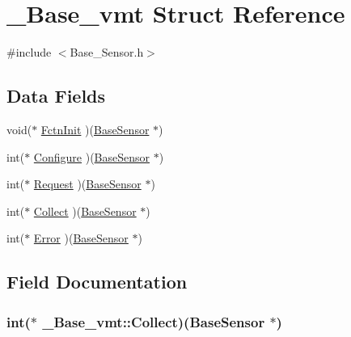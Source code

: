 \hypertarget{struct___base__vmt}{\section{\-\_\-\-Base\-\_\-vmt Struct Reference}
\label{struct___base__vmt}
}


{\ttfamily \#include $<$Base\-\_\-\-Sensor.\-h$>$}

\subsection*{Data Fields}
\begin{DoxyCompactItemize}
\item 
void($\ast$ \hyperlink{struct___base__vmt_ab21211ac2888f2e9c15ea3f7bdfe3e82}{Fctn\-Init} )(\hyperlink{_base___sensor_8h_ae91aa07b7bce6c6b463d63d8f214bb37}{Base\-Sensor} $\ast$)
\item 
int($\ast$ \hyperlink{struct___base__vmt_a4679051b7c8d66b3f4546c5e7c3d1457}{Configure} )(\hyperlink{_base___sensor_8h_ae91aa07b7bce6c6b463d63d8f214bb37}{Base\-Sensor} $\ast$)
\item 
int($\ast$ \hyperlink{struct___base__vmt_a082d37f332222c418394227f2de537f7}{Request} )(\hyperlink{_base___sensor_8h_ae91aa07b7bce6c6b463d63d8f214bb37}{Base\-Sensor} $\ast$)
\item 
int($\ast$ \hyperlink{struct___base__vmt_a3cb37486697b061a59526b2efa852ba4}{Collect} )(\hyperlink{_base___sensor_8h_ae91aa07b7bce6c6b463d63d8f214bb37}{Base\-Sensor} $\ast$)
\item 
int($\ast$ \hyperlink{struct___base__vmt_a64d04ad91e33e5f4636187057220cadd}{Error} )(\hyperlink{_base___sensor_8h_ae91aa07b7bce6c6b463d63d8f214bb37}{Base\-Sensor} $\ast$)
\end{DoxyCompactItemize}


\subsection{Field Documentation}
\hypertarget{struct___base__vmt_a3cb37486697b061a59526b2efa852ba4}{
\subsubsection[{Collect}]{\setlength{\rightskip}{0pt plus 5cm}int($\ast$ \-\_\-\-Base\-\_\-vmt\-::\-Collect)({\bf Base\-Sensor} $\ast$)}}\label{struct___base__vmt_a3cb37486697b061a59526b2efa852ba4}


